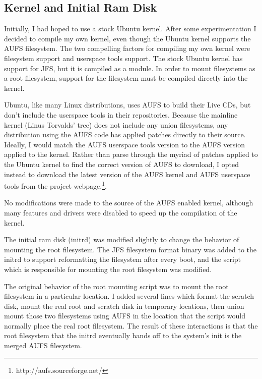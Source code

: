 \documentclass[12pt]{article}
\begin{document}
\subsection{Kernel and Initial Ram Disk}

Initially, I had hoped to use a stock Ubuntu kernel.  After some
experimentation I decided to compile my own kernel, even though the Ubuntu
kernel supports the AUFS filesystem.  The two compelling factors for compiling
my own kernel were filesystem support and userspace tools support.  The stock
Ubuntu kernel has support for JFS, but it is compiled as a module.  In order to
mount filesystems as a root filesystem, support for the filesystem must be
compiled directly into the kernel.

Ubuntu, like many Linux distributions, uses AUFS to build their Live CDs, but
don't include the userspace tools in their repositories.  Because the mainline
kernel (Linus Torvalds' tree) does not include any union filesystems, any
distribution using the AUFS code has applied patches directly to their source.
Ideally, I would match the AUFS userspace tools version to the AUFS version
applied to the kernel.  Rather than parse through the myriad of patches applied
to the Ubuntu kernel to find the correct version of AUFS to download, I opted
instead to download the latest version of the AUFS kernel and AUFS userspace
tools from the project webpage.\footnote{http://aufs.sourceforge.net/}.  

No modifications were made to the source of the AUFS enabled kernel, although
many features and drivers were disabled to speed up the compilation of the 
kernel.  

The initial ram disk (initrd) was modified slightly to change the behavior of mounting
the root filesystem.  The JFS filesystem format binary was added to the 
initrd to support reformatting the filesystem after every boot, and the 
script which is responsible for mounting the root filesystem was modified.

The original behavior of the root mounting script was to mount the root
filesystem in a particular location.  I added several lines which format the
scratch disk, mount the real root and scratch disk in temporary locations, then
union mount those two filesystems using AUFS in the location that the script
would normally place the real root filesystem.  The result of these
interactions is that the root filesystem that the initrd eventually hands off
to the system's init is the merged AUFS filesystem.
\end{document}
